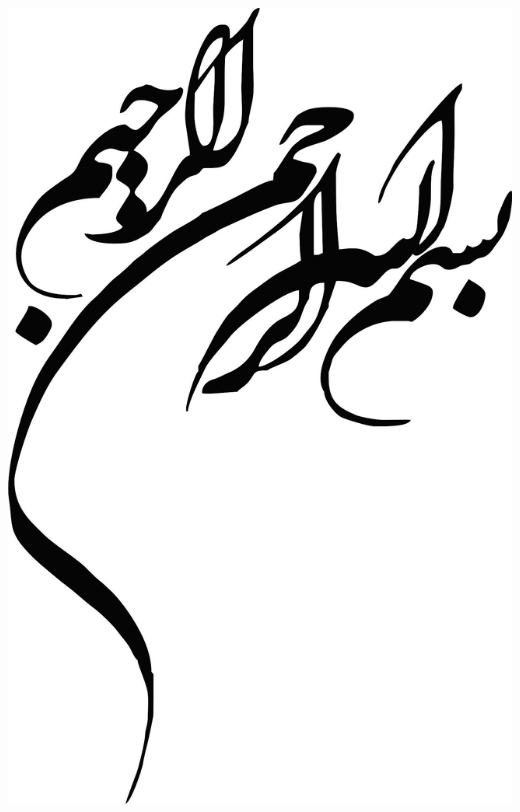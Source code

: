 

\thispagestyle{empty}
\mbox{}
\pagebreak

\thispagestyle{empty}
\begin{center}
	~\vfill
	\includegraphics[scale=1]{besm1.jpg}
	~\vfill
\end{center}
\pagebreak

